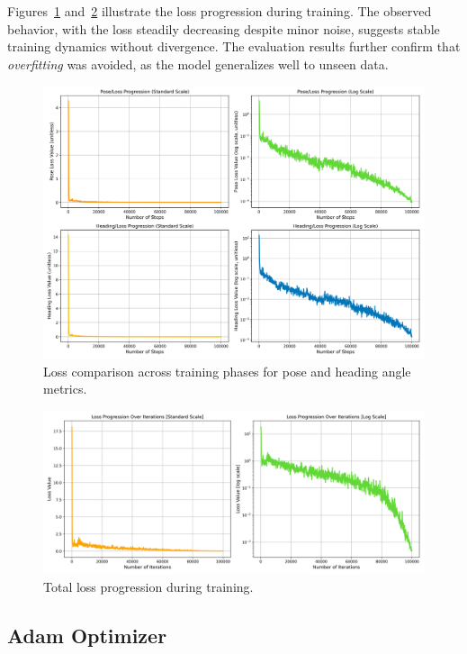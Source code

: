 Figures~\ref{fig:loss_comparison} and~\ref{fig:total_loss} illustrate the loss progression during training. The observed behavior, with the loss steadily decreasing despite minor noise, suggests stable training dynamics without divergence. The evaluation results further confirm that \textit{overfitting} was avoided, as the model generalizes well to unseen data.
\begin{figure}[H]
    \centering
    \includegraphics[width=1\linewidth]{LateX//figs/BEV1_l1sDEG_pose_heading_loss_comparison.png}
    \caption{Loss comparison across training phases for pose and heading angle metrics.}
    \label{fig:loss_comparison}
\end{figure}

\begin{figure}[H]
    \centering
    \includegraphics[width=1\linewidth]{LateX//figs/BEV2_loss_total_l1sDEG_progression_comparison.png}
    \caption{Total loss progression during training.}
    \label{fig:total_loss}
\end{figure}

\subsection*{Adam Optimizer}


